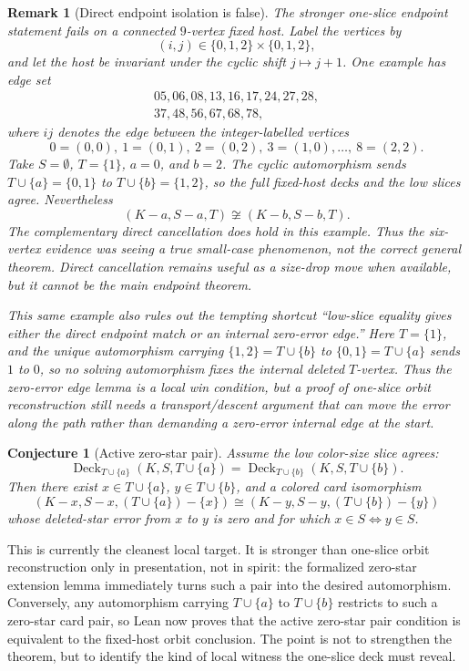 \documentclass[11pt]{article}
\newtheorem{conjecture}{Conjecture}
\newtheorem{remark}{Remark}
\newcommand{\Deck}{\operatorname{Deck}}
\begin{document}
\begin{remark}[Direct endpoint isolation is false]
The stronger one-slice endpoint statement fails on a connected \(9\)-vertex
fixed host.  Label the vertices by
\[
  (i,j)\in \{0,1,2\}\times\{0,1,2\},
\]
and let the host be invariant under the cyclic shift \(j\mapsto j+1\).  One
example has edge set
\[
\begin{gathered}
  05,06,08,13,16,17,24,27,28,\\
  37,48,56,67,68,78,
\end{gathered}
\]
where \(ij\) denotes the edge between the integer-labelled vertices
\[
  0=(0,0),\ 1=(0,1),\ 2=(0,2),\
  3=(1,0),\ldots,\ 8=(2,2).
\]
Take \(S=\emptyset\), \(T=\{1\}\), \(a=0\), and \(b=2\).  The cyclic
automorphism sends \(T\cup\{a\}=\{0,1\}\) to
\(T\cup\{b\}=\{1,2\}\), so the full fixed-host decks and the low slices agree.
Nevertheless
\[
  (K-a,S-a,T)\not\cong (K-b,S-b,T).
\]
The complementary direct cancellation does hold in this example.  Thus the
six-vertex evidence was seeing a true small-case phenomenon, not the correct
general theorem.  Direct cancellation remains useful as a size-drop move when
available, but it cannot be the main endpoint theorem.

This same example also rules out the tempting shortcut ``low-slice equality
gives either the direct endpoint match or an internal zero-error edge.''  Here
\(T=\{1\}\), and the unique automorphism carrying
\(\{1,2\}=T\cup\{b\}\) to \(\{0,1\}=T\cup\{a\}\) sends \(1\) to \(0\), so no
solving automorphism fixes the internal deleted \(T\)-vertex.  Thus the
zero-error edge lemma is a local win condition, but a proof of one-slice orbit
reconstruction still needs a transport/descent argument that can move the
error along the path rather than demanding a zero-error internal edge at the
start.
\end{remark}

\begin{conjecture}[Active zero-star pair]
Assume the low color-size slice agrees:
\[
  \Deck_{T\cup\{a\}}(K,S,T\cup\{a\})
  =
  \Deck_{T\cup\{b\}}(K,S,T\cup\{b\}).
\]
Then there exist \(x\in T\cup\{a\}\), \(y\in T\cup\{b\}\), and a colored card
isomorphism
\[
  (K-x,S-x,(T\cup\{a\})-\{x\})
  \cong
  (K-y,S-y,(T\cup\{b\})-\{y\})
\]
whose deleted-star error from \(x\) to \(y\) is zero and for which
\(x\in S\iff y\in S\).
\end{conjecture}

This is currently the cleanest local target.  It is stronger than one-slice
orbit reconstruction only in presentation, not in spirit: the formalized
zero-star extension lemma immediately turns such a pair into the desired
automorphism.  Conversely, any automorphism carrying \(T\cup\{a\}\) to
\(T\cup\{b\}\) restricts to such a zero-star card pair, so Lean now proves
that the active zero-star pair condition is equivalent to the fixed-host orbit
conclusion.  The point is not to strengthen the theorem, but to identify the
kind of local witness the one-slice deck must reveal.
\end{document}

